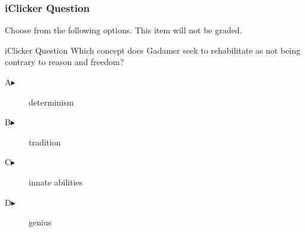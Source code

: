 \begin{frame}
  \frametitle{iClicker Question}
Choose from the following options. This item will not be graded.
\begin{block}{iClicker Question}
Which concept does Gadamer seek to rehabilitate as not being contrary
to reason and freedom?
\end{block}
\begin{description}
\item[A\hspace{.2in}$\blacktriangleright$] determinism
\item[B\hspace{.2in}$\blacktriangleright$] tradition
\item[C\hspace{.2in}$\blacktriangleright$] innate abilities
\item[D\hspace{.2in}$\blacktriangleright$] genius
\end{description}
\end{frame}
